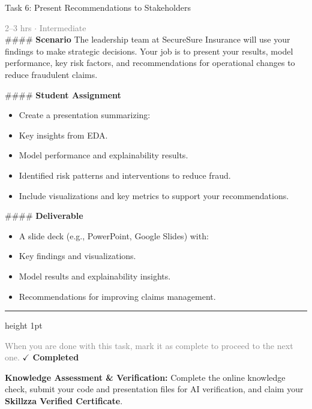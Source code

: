\documentclass[10pt,a4paper]{article}
\begin{document}
\begin{taskbox}{Task 6: Present Recommendations to Stakeholders}

    {\small \textcolor{gray}{2--3 hrs $\cdot$ Intermediate}}\\[12pt]

    \#\#\#\# \textbf{Scenario}
The leadership team at SecureSure Insurance will use your findings to make strategic decisions. Your job is to present your results, model performance, key risk factors, and recommendations for operational changes to reduce fraudulent claims.

\#\#\#\# \textbf{Student Assignment}
\begin{itemize}
    \item Create a presentation summarizing:
    \item Key insights from EDA.
    \item Model performance and explainability results.
    \item Identified risk patterns and interventions to reduce fraud.
    \item Include visualizations and key metrics to support your recommendations.
\end{itemize}

\#\#\#\# \textbf{Deliverable}
\begin{itemize}
    \item A slide deck (e.g., PowerPoint, Google Slides) with:
    \item Key findings and visualizations.
    \item Model results and explainability insights.
    \item Recommendations for improving claims management.\par
\end{itemize}

    \vspace{16pt}

    \textcolor{cardBorder}{\hrule height 1pt}\vspace{8pt}

    \small \textcolor{gray}{When you are done with this task, mark it as complete to proceed to the next one.} \hfill \textbf{\textcolor{brandDark}{$\checkmark$ Completed}}

\end{taskbox}

\begin{completionbox}
    \textbf{Knowledge Assessment \& Verification:} Complete the online knowledge check, submit your code and presentation files for AI verification, and claim your \textbf{Skillzza Verified Certificate}.
\end{completionbox}
\end{document}

